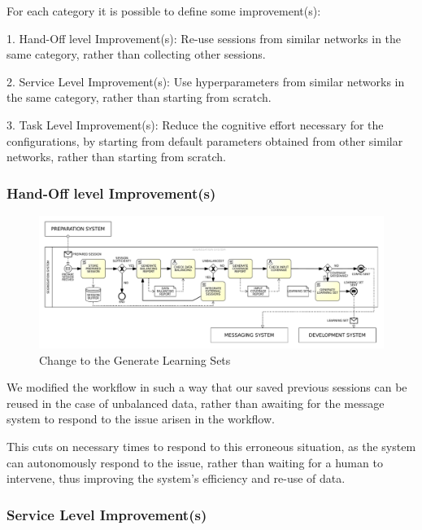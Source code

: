 For each category it is possible to define some improvement(s):

1. Hand-Off level Improvement(s): Re-use sessions from similar networks in the same category, rather than collecting other sessions.

2. Service Level Improvement(s): Use hyperparameters from similar networks in the same category, rather than starting from scratch.

3. Task Level Improvement(s): Reduce the cognitive effort necessary for the configurations, by starting from default parameters obtained from other similar networks, rather than starting from scratch.


\subsubsection{Hand-Off level Improvement(s)}
\label{subsec:hand_off_level_improvements}


\begin{figure}[H]
    \centering
    \includegraphics[width=1\textwidth]{figures/TO-BE Business Diagram - Generate Learning Sets.pdf}
    \caption{Change to the Generate Learning Sets}
    \label{fig:to_be_generate_learning_sets}
\end{figure}

We modified the workflow in such a way that our saved previous sessions
can be reused in the case of unbalanced data, rather than awaiting for the
message system to respond to the issue arisen in the workflow.

This cuts on necessary times to respond to this erroneous situation, as the
system can autonomously respond to the issue, rather than waiting for a human
to intervene, thus improving the system's efficiency and re-use of data.



\subsubsection{Service Level Improvement(s)}
\label{subsec:service_level_improvements}

